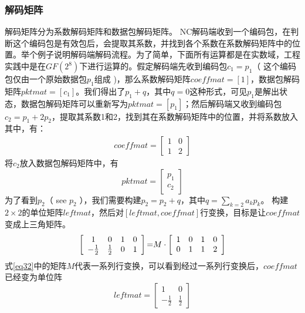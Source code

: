 \subsubsection{\textbf{解码矩阵}}
解码矩阵分为系数解码矩阵和数据包解码矩阵。
NC解码端收到一个编码包，在判断这个编码包是有效包后，会提取其系数，并找到各个系数在系数解码矩阵中的位置。举个例子说明解码端解码流程。为了简单，下面所有运算都是在实数域，工程实践中是在$GF\left(2^8\right)$下进行运算的。假定解码端先收到编码包$c_{1}=p_{1}$（ 这个编码包仅由一个原始数据包$p_{1}$组成 )，那么系数解码矩阵$coeffmat=\left[1\right]$，数据包解码矩阵$pktmat=\left[c_1\right]$。我们得出了$p_{1}+q$，其中$q=0$这种形式，可见$p_{1}$是解出状态，数据包解码矩阵可以重新写为$pktmat=\left[p_{1}\right]$；然后解码端又收到编码包$c_{2}=p_{1}+2p_{2}$，提取其系数1和2，找到其在系数解码矩阵中的位置，并将系数放入其中，有：
\begin{eqnarray}\label{eq31}
	coeffmat=\left[ {\begin{array}{*{20}{c}}
	1&0\\
	1&2
	\end{array}} \right]
\end{eqnarray}
将$c_{2}$放入数据包解码矩阵中，有
\begin{equation}\label{eq32}
pktmat = \left[ {\begin{array}{*{20}{c}}
	{{p_1}}\\
	{{c_2}}
	\end{array}} \right]
\end{equation}
为了看到$p_{2}$（ see $p_{2}$ ），我们需要构建$p_{2}=p_{2}+q$，其中$q=\sum\limits_{k = 2} {{a_k}{p_k}} $。
构建$2 \times 2$的单位矩阵$leftmat$，然后对$\left[ {leftmat,coeffmat} \right]$行变换，目标是让$coeffmat$变成上三角矩阵。
\begin{eqnarray}\label{eq33}
\left[ {\begin{array}{*{20}{c}}
	1&0&1&0\\
	{{\rm{ - }}\frac{1}{2}}&{\frac{1}{2}}&0&1
	\end{array}} \right]{\rm{ = }}M \cdot \left[ {\begin{array}{*{20}{c}}
	1&0&1&0\\
	0&1&1&2
	\end{array}} \right]
\end{eqnarray}
式\ref{eq32}中的矩阵$M$代表一系列行变换，可以看到经过一系列行变换后，$coeffmat$已经变为单位阵
\begin{equation}\label{eq34}
leftmat = \left[ {\begin{array}{*{20}{c}}
	1&0\\
	{ - \frac{1}{2}}&{\frac{1}{2}} 
	\end{array}} \right]
\end{equation}
